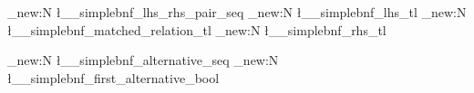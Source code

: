 \seq_new:N \l__simplebnf_lhs_rhs_pair_seq
\tl_new:N \l__simplebnf_lhs_tl
\tl_new:N \l__simplebnf_matched_relation_tl
\tl_new:N \l__simplebnf_rhs_tl

\seq_new:N \l__simplebnf_alternative_seq
\bool_new:N \l__simplebnf_first_alternative_bool

